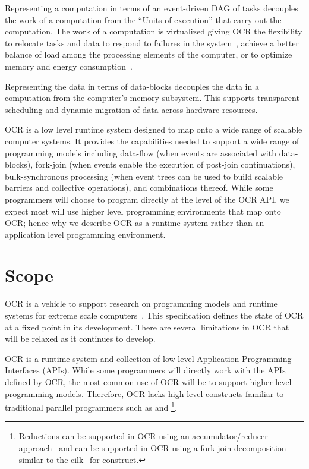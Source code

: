 Representing a computation in terms of an event-driven DAG of tasks
decouples the work of a computation
from the ``Units of execution'' that carry out the computation.  The work
of a computation is virtualized giving OCR the flexibility to relocate tasks and data
to respond to failures in the system~\cite{Vrvilo14}, achieve a better balance of load
among the processing elements of the computer, or to optimize memory
and energy consumption~\cite{GZCS10,Guo10,CTBCCGYS13,SbBS14}.

Representing the data in terms of data-blocks
decouples the data in a computation from the computer's memory subsystem.
This supports transparent scheduling and dynamic migration of data
across hardware resources.

OCR is a low level runtime system designed to map onto a wide range of scalable
computer systems.
It provides the capabilities needed to support a wide range of programming models
including data-flow (when events are associated with data-blocks),
fork-join (when events enable the execution of post-join
continuations), bulk-synchronous processing (when event trees can be
used to build scalable barriers and collective operations), and
combinations thereof.  While some programmers will choose to program directly
at the level of the OCR API, we expect most will use higher level
programming environments that map onto OCR; hence why we describe OCR as a
runtime system rather than an application level programming environment.


\section{Scope}
\label{sec:Scope}

OCR is a vehicle to support research on programming models and
runtime systems for extreme scale
computers~\cite{ExascaleSoftwareStudy2009,SaHS10}. This specification
defines the state of OCR at a fixed point in its development. There
are several limitations in OCR that will be relaxed as it continues to
develop.

OCR is a runtime system and collection of low level Application
Programming Interfaces (APIs). While some programmers will directly
work with the APIs defined by OCR, the most common use of OCR will be
to support higher level programming models. Therefore, OCR lacks high
level constructs familiar to traditional parallel programmers such as
 and \footnote{Reductions can be
supported in OCR using an accumulator/reducer
approach~\cite{Frigo:2009:ROC:1583991.1584017,SCZS13} and
 can be supported in OCR
using a fork-join decomposition similar to the cilk\_for construct.}.

